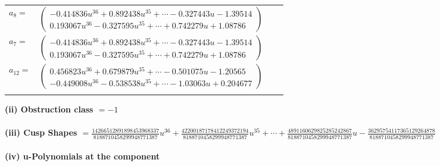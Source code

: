 \documentclass[1p]{elsarticle_modified}
\theoremstyle{definition}
\begin{document}
\begin{tabular}{m{7pt} m{180pt} m{7pt} m{180pt} }
\flushright $a_{8}=$&$\begin{pmatrix}-0.414836 u^{36}+0.892438 u^{35}+\cdots-0.327443 u-1.39514\\0.193067 u^{36}-0.327595 u^{35}+\cdots+0.742279 u+1.08786\end{pmatrix}$ \\
\flushright $a_{7}=$&$\begin{pmatrix}-0.414836 u^{36}+0.892438 u^{35}+\cdots-0.327443 u-1.39514\\0.193067 u^{36}-0.327595 u^{35}+\cdots+0.742279 u+1.08786\end{pmatrix}$ \\
\flushright $a_{12}=$&$\begin{pmatrix}0.456823 u^{36}+0.679879 u^{35}+\cdots-0.501075 u-1.20565\\-0.449008 u^{36}-0.538538 u^{35}+\cdots-1.03063 u+0.204677\end{pmatrix}$\\&\end{tabular}
\flushleft \textbf{(ii) Obstruction class $= -1$}\\~\\
\flushleft \textbf{(iii) Cusp Shapes $= \frac{14266512891898453968337}{8188710458299948771387} u^{36}+\frac{42200187178412249372194}{8188710458299948771387} u^{35}+\cdots+\frac{4891160629825285242867}{8188710458299948771387} u-\frac{36295754117365129264878}{8188710458299948771387}$}\\~\\
\newpage\renewcommand{\arraystretch}{1}
\flushleft \textbf{(iv) u-Polynomials at the component}\newline \\
\end{document}

